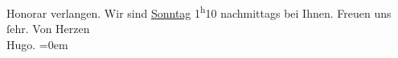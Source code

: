 \begin{ledgroupsized}[t]{13cm}
               Honorar verlangen.\pend
           \pstart
           Wir sind \uline{Sonntag}{ }1\textsuperscript{h}10 nachmittags bei Ihnen. Freuen uns
               ſehr.\pend
           \pstart
           Von Herzen{\\[\baselineskip]}\spacefill\mbox{Hugo.}\pend
           \leftskip=0em{}          \endnumbering{}\end{ledgroupsized}  \newcommand{\dateiname}{L01690}\newcommand{\titel}{Hugo von Hofmannsthal an Arthur Schnitzler, 11. 7. 1907}\newcommand{\editorInnen}{Martin Anton Müller und Gerd-Hermann Susen}
            \footnotesize
\begin{ledgroupsized}[t]{11.5cm}
\end{ledgroupsized}
         
      